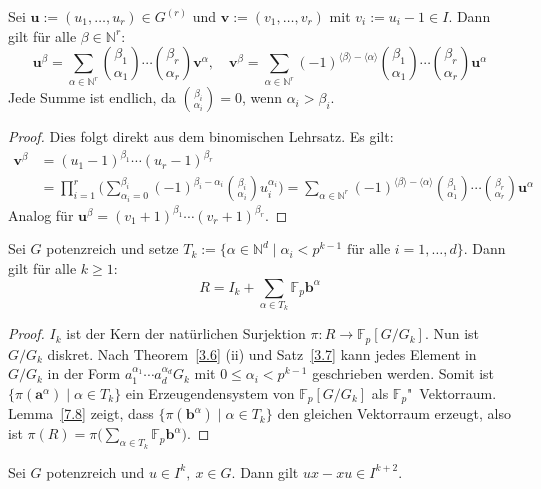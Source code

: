 \documentclass[11pt,a4paper,openany]{memoir}
\begin{document}
\begin{lemma}\label{7.8}
Sei $\mathbf{u}:=(u_1,\ldots,u_r)\in G^{(r)}$ und $\mathbf{v}:=(v_1,\ldots,v_r)$ mit $v_i:=u_i-1\in I$. Dann gilt für alle $\beta\in\mathbb{N}^r$:
\[\mathbf{u}^\beta =\sum_{\alpha\in\mathbb{N}^r}\binom{\beta_1}{\alpha_1}\cdots\binom{\beta_r}{\alpha_r}\mathbf{v}^\alpha ,\quad \mathbf{v}^\beta=\sum_{\alpha\in\mathbb{N}^r} (-1)^{\langle \beta\rangle -\langle \alpha\rangle}\binom{\beta_1}{\alpha_1}\cdots\binom{\beta_r}{\alpha_r} \mathbf{u}^\alpha \]
Jede Summe ist endlich, da $\binom{\beta_i}{\alpha_i}=0$, wenn $\alpha_i>\beta_i$.
\end{lemma}

\begin{proof}
Dies folgt direkt aus dem binomischen Lehrsatz. Es gilt:
\begin{align*}
\mathbf{v}^\beta &= (u_1-1)^{\beta_1}\cdots (u_r-1)^{\beta_r}\\
&=\prod_{i=1}^r \Big(\sum_{\alpha_i=0}^{\beta_i} (-1)^{\beta_i-\alpha_i}\binom{\beta_i}{\alpha_i} u_i^{\alpha_i}\Big)= \sum_{\alpha\in\mathbb{N}^r}(-1)^{\langle \beta\rangle-\langle\alpha\rangle}\binom{\beta_1}{\alpha_1}\cdots\binom{\beta_r}{\alpha_r} \mathbf{u}^\alpha
\end{align*}
Analog für $\mathbf{u}^\beta = (v_1+1)^{\beta_1}\cdots (v_r+1)^{\beta_r}$.
\end{proof}

\begin{lemma}\label{7.9}
Sei $G$ potenzreich und setze $T_k:=\{ \alpha\in\mathbb{N}^d\mid \alpha_i< p^{k-1}\text{ für alle }i=1,\ldots,d \}$. Dann gilt für alle $k\geq 1$:
\[R=I_k+\sum_{\alpha\in T_k} \mathbb{F}_p \mathbf{b}^\alpha \]
\end{lemma}

\begin{proof}
$I_k$ ist der Kern der natürlichen Surjektion $\pi:R\to \mathbb{F}_p[G/G_k]$. Nun ist $G/G_k$ diskret. Nach Theorem~\ref{3.6} (ii) und Satz~\ref{3.7} kann jedes Element in $G/G_k$ in der Form $a_1^{\alpha_1}\cdots a_d^{\alpha_d}G_k$ mit $0\leq\alpha_i <p^{k-1}$ geschrieben werden. Somit ist $\{\pi(\mathbf{a}^\alpha)\mid\alpha\in T_k \}$ ein Erzeugendensystem von $\mathbb{F}_p[G/G_k]$ als $\mathbb{F}_p$"~Vektorraum. Lemma~\ref{7.8} zeigt, dass $\{\pi(\mathbf{b}^\alpha)\mid \alpha\in T_k\}$ den gleichen Vektorraum erzeugt, also ist $\pi(R)=\pi\big(\sum_{\alpha\in T_k}\mathbb{F}_p  \mathbf{b}^\alpha\big)$.
\end{proof}

\begin{lemma}\label{7.10}
Sei $G$ potenzreich und $u\in I^k,\ x\in G$. Dann gilt $ux-xu\in I^{k+2}$.
\end{lemma}
\end{document}
